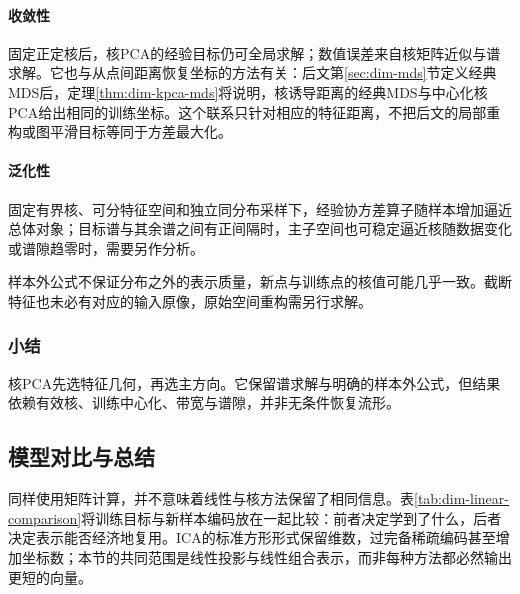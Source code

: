 \paragraph{收敛性}

固定正定核后，核PCA的经验目标仍可全局求解；数值误差来自核矩阵近似与谱求解。它也与从点间距离恢复坐标的方法有关：后文第\ref{sec:dim-mds}节定义经典MDS后，定理\ref{thm:dim-kpca-mds}将说明，核诱导距离的经典MDS与中心化核PCA给出相同的训练坐标。这个联系只针对相应的特征距离，不把后文的局部重构或图平滑目标等同于方差最大化。

\paragraph{泛化性}

固定有界核、可分特征空间和独立同分布采样下，经验协方差算子随样本增加逼近总体对象；目标谱与其余谱之间有正间隔时，主子空间也可稳定逼近核随数据变化或谱隙趋零时，需要另作分析。

样本外公式不保证分布之外的表示质量，新点与训练点的核值可能几乎一致。截断特征也未必有对应的输入原像，原始空间重构需另行求解。

\subsubsection{小结}

核PCA先选特征几何，再选主方向。它保留谱求解与明确的样本外公式，但结果依赖有效核、训练中心化、带宽与谱隙，并非无条件恢复流形。

\subsection{模型对比与总结}
\label{sec:dim-linear-comparison}

同样使用矩阵计算，并不意味着线性与核方法保留了相同信息。表\ref{tab:dim-linear-comparison}将训练目标与新样本编码放在一起比较：前者决定学到了什么，后者决定表示能否经济地复用。ICA的标准方形形式保留维数，过完备稀疏编码甚至增加坐标数；本节的共同范围是线性投影与线性组合表示，而非每种方法都必然输出更短的向量。

